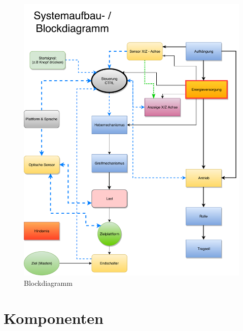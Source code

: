 \documentclass[a4paper]{report}
\begin{document}
\begin{figure}[h!]
	\centering
	\includegraphics[keepaspectratio,width=\textwidth]{Blockdiagramm}
	\caption{Blockdiagramm}
	\label{fig:Blockdiagramm}
\end{figure}

\newpage

\section{Komponenten}
\label{sec:Pren02Komponenten}
\end{document}
